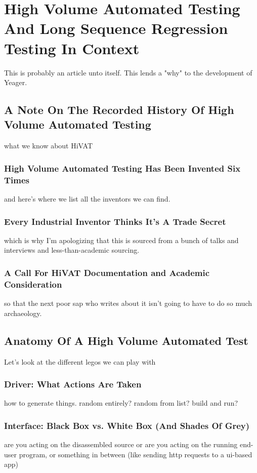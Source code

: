 \chapter{High Volume Automated Testing And Long Sequence Regression Testing In Context}
This is probably an article unto itself. This lends a "why" to the development of Yeager. %

\section{A Note On The Recorded History Of High Volume Automated Testing}
what we know about HiVAT %

\subsection{High Volume Automated Testing Has Been Invented Six Times}
and here's where we list all the inventors we can find.
\citep{miller1990empirical} %

\subsection{Every Industrial Inventor Thinks It's A Trade Secret}
which is why I'm apologizing that this is sourced from a bunch of talks and interviews and less-than-academic sourcing. %

\subsection{A Call For HiVAT Documentation and Academic Consideration}
so that the next poor sap who writes about it isn't going to have to do so much archaeology. %

\section{Anatomy Of A High Volume Automated Test}
Let's look at the different legos we can play with %

\subsection{Driver: What Actions Are Taken}
how to generate things. random entirely? random from list? build and run? %

\subsection{Interface: Black Box vs. White Box (And Shades Of Grey)}
are you acting on the disassembled source or are you acting on the running end-user program, or something in between (like sending http requests to a ui-based app) %

